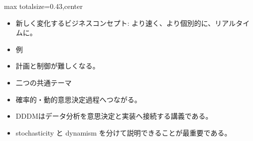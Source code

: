 \clearpage
{}
\begin{minipage}[t]{0.405\textwidth}
\begin{adjustbox}{max totalsize={\textwidth}{0.43\textheight},center}
\begin{minipage}{\textwidth}\scriptsize
{}\begin{itemize}
\item 新しく変化するビジネスコンセプト: より速く、より個別的に、リアルタイムに。
\item 例
\item 計画と制御が難しくなる。
\item 二つの共通テーマ
\item 確率的・動的意思決定過程へつながる。
\end{itemize}\begin{itemize}
\item DDDMはデータ分析を意思決定と実装へ接続する講義である。
\item stochasticity と dynamism を分けて説明できることが最重要である。
\end{itemize}
\end{minipage}
\end{adjustbox}
\end{minipage}\hfill
